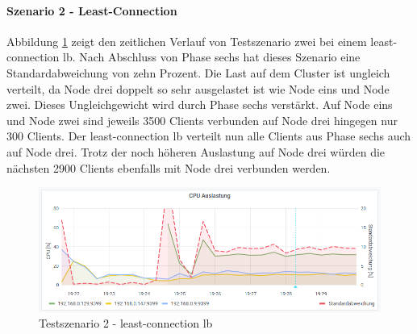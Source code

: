 \paragraph{Szenario 2 - Least-Connection}
Abbildung \ref{fig:s2-lc} zeigt den zeitlichen Verlauf von Testszenario zwei bei einem least-connection \ac{lb}.
Nach Abschluss von Phase sechs hat dieses Szenario eine Standardabweichung von zehn Prozent.
Die Last auf dem Cluster ist ungleich verteilt, da Node drei doppelt so sehr ausgelastet ist wie Node eins und Node zwei.
Dieses Ungleichgewicht wird durch Phase sechs verstärkt. Auf Node eins und Node zwei sind jeweils 3500 Clients verbunden auf Node drei hingegen nur 300 Clients. Der least-connection \acl{lb} verteilt nun alle Clients aus Phase sechs auch auf Node drei. Trotz der noch höheren Auslastung auf Node drei würden die nächsten 2900 Clients ebenfalls mit Node drei verbunden werden.
\newpage
\begin{figure}[h]
    \centering
    \includegraphics[scale=0.8]{images/s2_lc.png}
    \caption{Testszenario 2 - least-connection \acl{lb}}
    \label{fig:s2-lc}
\end{figure}


